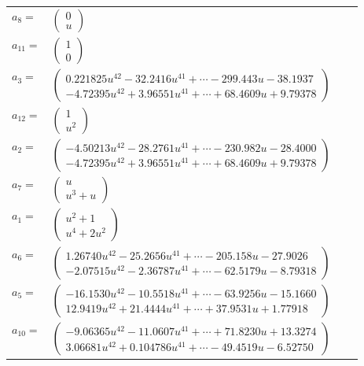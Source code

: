 \documentclass[1p]{elsarticle_modified}
\theoremstyle{definition}
\begin{document}
\begin{tabular}{m{7pt} m{180pt} m{7pt} m{180pt} }
\flushright $a_{8}=$&$\begin{pmatrix}0\\u\end{pmatrix}$ \\
\flushright $a_{11}=$&$\begin{pmatrix}1\\0\end{pmatrix}$ \\
\flushright $a_{3}=$&$\begin{pmatrix}0.221825 u^{42}-32.2416 u^{41}+\cdots-299.443 u-38.1937\\-4.72395 u^{42}+3.96551 u^{41}+\cdots+68.4609 u+9.79378\end{pmatrix}$ \\
\flushright $a_{12}=$&$\begin{pmatrix}1\\u^2\end{pmatrix}$ \\
\flushright $a_{2}=$&$\begin{pmatrix}-4.50213 u^{42}-28.2761 u^{41}+\cdots-230.982 u-28.4000\\-4.72395 u^{42}+3.96551 u^{41}+\cdots+68.4609 u+9.79378\end{pmatrix}$ \\
\flushright $a_{7}=$&$\begin{pmatrix}u\\u^3+u\end{pmatrix}$ \\
\flushright $a_{1}=$&$\begin{pmatrix}u^2+1\\u^4+2 u^2\end{pmatrix}$ \\
\flushright $a_{6}=$&$\begin{pmatrix}1.26740 u^{42}-25.2656 u^{41}+\cdots-205.158 u-27.9026\\-2.07515 u^{42}-2.36787 u^{41}+\cdots-62.5179 u-8.79318\end{pmatrix}$ \\
\flushright $a_{5}=$&$\begin{pmatrix}-16.1530 u^{42}-10.5518 u^{41}+\cdots-63.9256 u-15.1660\\12.9419 u^{42}+21.4444 u^{41}+\cdots+37.9531 u+1.77918\end{pmatrix}$ \\
\flushright $a_{10}=$&$\begin{pmatrix}-9.06365 u^{42}-11.0607 u^{41}+\cdots+71.8230 u+13.3274\\3.06681 u^{42}+0.104786 u^{41}+\cdots-49.4519 u-6.52750\end{pmatrix}$ \\

\end{tabular}
\end{document}
